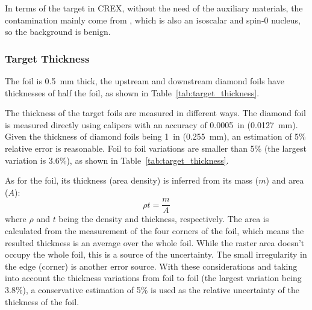In terms of the \Ca target in CREX, without the need of the auxiliary materials,
the contamination mainly come from \ca, which is also an isoscalar
and spin-0 nucleus, so the background is benign.

\subsubsection{Target Thickness}
The \Pb foil is 0.5~mm thick, the upstream and downstream diamond foils 
have thicknesses of half the \Pb foil, as shown in Table~\ref{tab:target_thickness}.

The thickness of the target foils are measured in different ways. The diamond foil 
is measured directly using calipers with an accuracy of 0.0005~in (0.0127~mm).
Given the thickness of diamond foils being 1~in (0.255~mm), an estimation of 5\% 
relative error is reasonable. Foil to foil variations are smaller than 5\% (the
largest variation is 3.6\%), as shown in Table~\ref{tab:target_thickness}.

As for the \Pb foil, its thickness (area density) is inferred from its mass ($m$)
and area ($A$):
\begin{equation}
    \rho t = \frac{m}{A}
\end{equation}
where $\rho$ and $t$ being the density and thickness, respectively.
The area is calculated from the measurement of the four corners of the \Pb foil,
which means the resulted thickness is an average over the whole foil. While
the raster area doesn't occupy the whole foil, this is a source of the uncertainty. 
The small irregularity in the edge (corner) is another error source. 
With these considerations and taking into account the thickness variations 
from foil to foil (the largest variation being 3.8\%),
a conservative estimation of 5\% is used as the
relative uncertainty of the thickness of the \Pb foil. 

